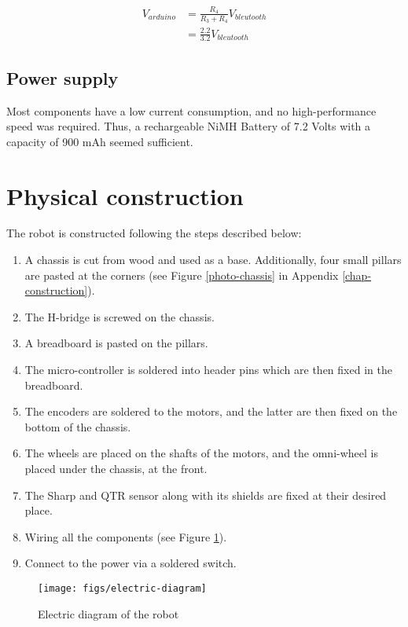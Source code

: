 \documentclass[12pt]{report}
\begin{document}
\begin{align*} 
V_{arduino} &=  \frac{R_4}{R_3+R_4}V_{bleutooth} \\[0.4cm]
 &=  \frac{2.2}{3.2}V_{bleutooth}
\end{align*}

\subsection*{Power supply}
Most components have a low current consumption, and no high-performance speed was required. Thus, a rechargeable NiMH Battery of 7.2 Volts with a capacity of 900 mAh seemed sufficient.

\section{Physical construction}\label{sec:phys-constru}
The robot is constructed following the steps described below:
\begin{enumerate}
\item A chassis is cut from wood and used as a base. Additionally, four small pillars are pasted at the corners (see Figure \ref{photo-chassis} in Appendix \ref{chap-construction}).
\item The H-bridge is screwed on the chassis.
\item A breadboard is pasted on the pillars.
\item The micro-controller is soldered into header pins which are then fixed in the breadboard.
\item The encoders are soldered to the motors, and the latter are then fixed on the bottom of the chassis.
\item The wheels are placed on the shafts of the motors, and the omni-wheel is placed under the chassis, at the front.
\item The Sharp and QTR sensor along with its shields are fixed at their desired place.
\item Wiring all the components (see Figure \ref{fig:electric-diagram}).
\item Connect to the power via a soldered switch.
\end{enumerate}

\clearpage
\vfill
\begin{figure}[!h]
\centering
\texttt{[image: figs/electric-diagram]}
\caption{Electric diagram of the robot}
\label{fig:electric-diagram}
\end{figure}
\vfill
\clearpage
\end{document}
